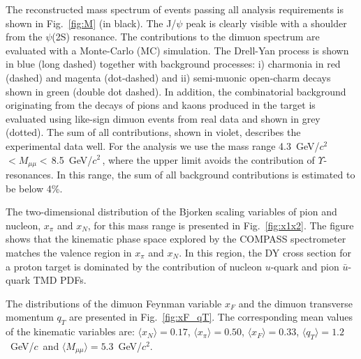 \documentclass[a4paper,manyauthors,nocleardouble,COMPASS]{cernphprep}
\newcommand{\gvc}{GeV/$c$}
\newcommand{\gvcw}{GeV/$c^2$}
\newcommand{\red}{\textcolor[rgb]{1.00,0.00,0.00}}
\begin{document}
%

The reconstructed mass spectrum of events passing all analysis requirements is shown in Fig.~\ref{fig:M} (in black). The J/$\psi$ peak is clearly visible with a shoulder
from the $\psi$(2S) resonance.  The contributions to the dimuon spectrum are evaluated with a Monte-Carlo (MC) simulation. The Drell-Yan process is shown in blue (long dashed) together with background processes: i) charmonia in red (dashed) and magenta (dot-dashed) and ii) semi-muonic open-charm decays shown in green (double dot dashed).
%
In addition, the combinatorial background originating from the decays of pions and kaons produced in the target is evaluated using like-sign dimuon events from real data and shown in grey (dotted).
The sum of all contributions, shown in violet, describes the
experimental data well. For the analysis we use the mass range 4.3~\gvcw\,$ < M_{\mu\mu} < $\,8.5~\gvcw\,, where the upper limit avoids the contribution of $\Upsilon$-resonances. In this range, the sum of all background contributions is estimated to be below 4\%.

The two-dimensional distribution of the Bjorken scaling variables of pion and nucleon, $x_{\pi}$ and $x_{N}$, for this mass range is presented in Fig.~\ref{fig:x1x2}. The figure shows that the kinematic phase space explored by the COMPASS spectrometer matches the valence region in $x_{\pi}$ and $x_{N}$. In this region, the DY cross section for a proton target is dominated by the contribution of nucleon $u$-quark and pion $\bar{u}$-quark TMD PDFs.


The distributions of the dimuon Feynman variable $x_{F}$ and the dimuon transverse momentum $q_{T}$ are presented in Fig.~\ref{fig:xF_qT}. The corresponding mean values of the kinematic variables are: $\langle x_{N} \rangle=0.17$,
$\langle x_{\pi} \rangle=0.50$,
$\langle x_{F} \rangle=0.33$,
$\langle q_{T} \rangle=1.2$~\gvc\, and
$\langle M_{\mu\mu} \rangle=5.3$~\gvcw.
\end{document}

